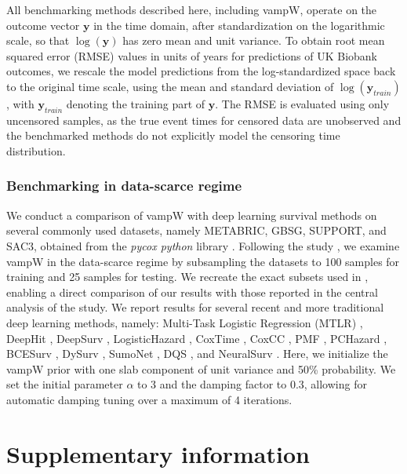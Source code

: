 All benchmarking methods described here, including vampW, operate on the outcome vector $\bm{y}$ in the time domain, after standardization on the logarithmic scale, so that $\log(\bm{y})$ has zero mean and unit variance. To obtain root mean squared error (RMSE) values in units of years for predictions of UK Biobank outcomes, we rescale the model predictions %
from the log-standardized space back to the original time scale, using the mean and standard deviation of $\log(\bm{y}_{train})$, with $\bm{y}_{train}$ denoting the training part of $\bm{y}$. The RMSE is evaluated using only uncensored samples, as the true event times for censored data are unobserved and the benchmarked methods do not explicitly model the censoring time distribution.

\enlargethispage{1\baselineskip}

\subsubsection{Benchmarking in data-scarce regime}
We conduct a comparison of vampW with deep learning survival methods on several commonly used datasets, namely METABRIC, GBSG, SUPPORT, and SAC3, obtained from the \textit{pycox python} library \cite{havard_kvamme_pycox_2024}. Following the study \cite{monod_neuralsurv_2025}, we examine vampW in the data-scarce regime by subsampling the datasets to 100 samples for training and 25 samples for testing. We recreate the exact subsets used in \cite{monod_neuralsurv_2025}, enabling a direct comparison of our results with those reported in the central analysis of the study. We report results for several recent and more traditional deep learning methods, namely: Multi-Task Logistic Regression (MTLR) \cite{Yu2011LearningPC}, DeepHit \cite{Lee_Zame_Yoon_van_der_Schaar_2018}, DeepSurv \cite{katzman_deepsurv_2018}, LogisticHazard \cite{gensheimer_scalable_2019}, 
CoxTime \cite{CoxTime2019}, CoxCC \cite{CoxTime2019}, PMF \cite{PChazard2021}, PCHazard \cite{PChazard2021}, BCESurv \cite{JMLR:v24:19-1030}, DySurv \cite{10.1093/jamia/ocae271}, 
SumoNet \cite{pmlr-v151-rindt22a}, DQS \cite{pmlr-v202-yanagisawa23a}, 
and NeuralSurv \cite{monod_neuralsurv_2025}. Here, we initialize the vampW prior with one slab component of unit variance and 50\% probability. We set the initial parameter $\alpha$ to 3 and the damping factor to 0.3, allowing for automatic damping tuning over a maximum of 4 iterations.

\section{Supplementary information}


